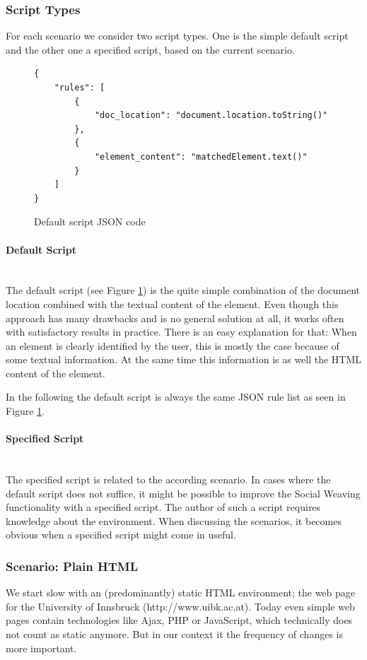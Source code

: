 \subsubsection{Script Types}
For each scenario we consider two script types. One is the simple default script and the other one a specified script, based on the current scenario.

\begin{figure}\centering
\begin{lstlisting}
{
    "rules": [
        {
            "doc_location": "document.location.toString()"
        },
        {
            "element_content": "matchedElement.text()"
        }
    ]
}
\end{lstlisting}
		\caption{Default script JSON code}
		\label{default-script-code}
\end{figure} 

\paragraph{Default Script}\mbox{}\\
The default script (see Figure \ref{default-script-code}) is the quite simple combination of the document location combined with the textual content of the element. Even though this approach has many drawbacks and is no general solution at all, it works often with satisfactory results in practice. There is an easy explanation for that: When an element is clearly identified by the user, this is mostly the case because of some textual information. At the same time this information is as well the HTML content of the element. 

In the following the default script is always the same JSON rule list as seen in Figure \ref{default-script-code}. 

\paragraph{Specified Script}\mbox{}\\
The specified script is related to the according scenario. In cases where the default script does not suffice, it might be possible to improve the Social Weaving functionality with a specified script. The author of such a script requires knowledge about the environment. When discussing the scenarios, it becomes obvious when a specified script might come in useful. 

\subsubsection{Scenario: Plain HTML}
We start slow with an (predominantly) static HTML environment; the web page for the University of Innsbruck (http://www.uibk.ac.at). Today even simple web pages contain technologies like Ajax, PHP or JavaScript, which technically does not count as static anymore. But in our context it the frequency of changes is more important. 

